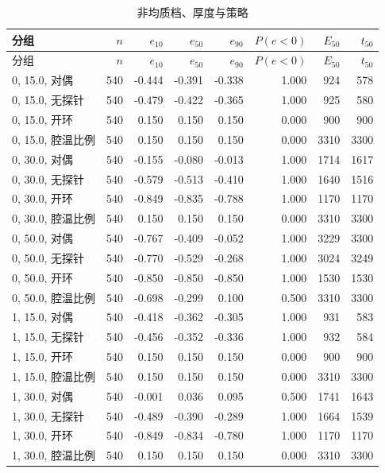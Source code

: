 \begin{longtable}{lrrrrrrr}
\caption{非均质档、厚度与策略}\\
\toprule
分组 & $n$ & $e_{10}$ & $e_{50}$ & $e_{90}$ & $P(e{<}0)$ & $E_{50}$ & $t_{50}$ \\
\midrule
\endfirsthead
\toprule
分组 & $n$ & $e_{10}$ & $e_{50}$ & $e_{90}$ & $P(e{<}0)$ & $E_{50}$ & $t_{50}$ \\
\midrule
\endhead
0, 15.0, 对偶 & 540 & -0.444 & -0.391 & -0.338 & 1.000 & 924 & 578 \\
0, 15.0, 无探针 & 540 & -0.479 & -0.422 & -0.365 & 1.000 & 925 & 580 \\
0, 15.0, 开环 & 540 & 0.150 & 0.150 & 0.150 & 0.000 & 900 & 900 \\
0, 15.0, 腔温比例 & 540 & 0.150 & 0.150 & 0.150 & 0.000 & 3310 & 3300 \\
0, 30.0, 对偶 & 540 & -0.155 & -0.080 & -0.013 & 1.000 & 1714 & 1617 \\
0, 30.0, 无探针 & 540 & -0.579 & -0.513 & -0.410 & 1.000 & 1640 & 1516 \\
0, 30.0, 开环 & 540 & -0.849 & -0.835 & -0.788 & 1.000 & 1170 & 1170 \\
0, 30.0, 腔温比例 & 540 & 0.150 & 0.150 & 0.150 & 0.000 & 3310 & 3300 \\
0, 50.0, 对偶 & 540 & -0.767 & -0.409 & -0.052 & 1.000 & 3229 & 3300 \\
0, 50.0, 无探针 & 540 & -0.770 & -0.529 & -0.268 & 1.000 & 3024 & 3249 \\
0, 50.0, 开环 & 540 & -0.850 & -0.850 & -0.850 & 1.000 & 1530 & 1530 \\
0, 50.0, 腔温比例 & 540 & -0.698 & -0.299 & 0.100 & 0.500 & 3310 & 3300 \\
1, 15.0, 对偶 & 540 & -0.418 & -0.362 & -0.305 & 1.000 & 931 & 583 \\
1, 15.0, 无探针 & 540 & -0.456 & -0.352 & -0.336 & 1.000 & 932 & 584 \\
1, 15.0, 开环 & 540 & 0.150 & 0.150 & 0.150 & 0.000 & 900 & 900 \\
1, 15.0, 腔温比例 & 540 & 0.150 & 0.150 & 0.150 & 0.000 & 3310 & 3300 \\
1, 30.0, 对偶 & 540 & -0.001 & 0.036 & 0.095 & 0.500 & 1741 & 1643 \\
1, 30.0, 无探针 & 540 & -0.489 & -0.390 & -0.289 & 1.000 & 1664 & 1539 \\
1, 30.0, 开环 & 540 & -0.849 & -0.834 & -0.780 & 1.000 & 1170 & 1170 \\
1, 30.0, 腔温比例 & 540 & 0.150 & 0.150 & 0.150 & 0.000 & 3310 & 3300 \\

\end{longtable}
